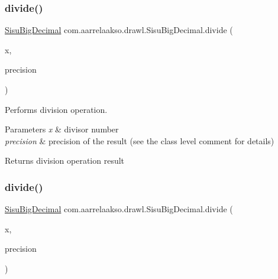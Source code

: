 \mbox{\label{classcom_1_1aarrelaakso_1_1drawl_1_1_sisu_big_decimal_ae205ef47f514e99e0ca571001ad1ea69}} 
\subsubsection{\texorpdfstring{divide()}{divide()}\hspace{0.1cm}{\footnotesize\ttfamily [2/3]}}
{\footnotesize\ttfamily \hyperlink{classcom_1_1aarrelaakso_1_1drawl_1_1_sisu_big_decimal}{Sisu\+Big\+Decimal} com.\+aarrelaakso.\+drawl.\+Sisu\+Big\+Decimal.\+divide (\begin{DoxyParamCaption}\item[{\hyperlink{classcom_1_1aarrelaakso_1_1drawl_1_1_sisu_big_decimal}{Sisu\+Big\+Decimal}}]{x,  }\item[{int}]{precision }\end{DoxyParamCaption})\hspace{0.3cm}{\ttfamily [protected]}}

Performs division operation.


\begin{DoxyParams}{Parameters}
{\em x} & divisor number \\
\hline
{\em precision} & precision of the result (see the class level comment for details) \\
\hline
\end{DoxyParams}
\begin{DoxyReturn}{Returns}
division operation result 
\end{DoxyReturn}
\mbox{\label{classcom_1_1aarrelaakso_1_1drawl_1_1_sisu_big_decimal_a434a75dd442a5dc4ccb8a7af48ff4728}} 
\subsubsection{\texorpdfstring{divide()}{divide()}\hspace{0.1cm}{\footnotesize\ttfamily [3/3]}}
{\footnotesize\ttfamily \hyperlink{classcom_1_1aarrelaakso_1_1drawl_1_1_sisu_big_decimal}{Sisu\+Big\+Decimal} com.\+aarrelaakso.\+drawl.\+Sisu\+Big\+Decimal.\+divide (\begin{DoxyParamCaption}\item[{double}]{x,  }\item[{int}]{precision }\end{DoxyParamCaption})\hspace{0.3cm}{\ttfamily [protected]}}

